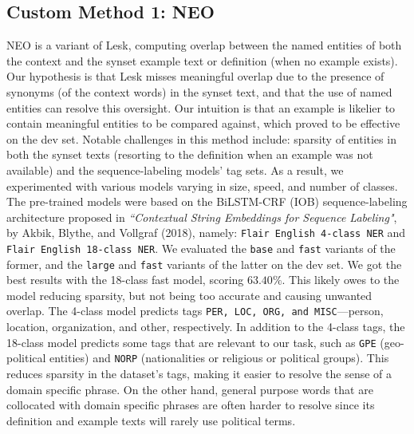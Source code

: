 \documentclass[11pt]{article}
\begin{document}
\vspace{-2ex}
\subsection{Custom Method 1: NEO}
\vspace{-1ex}
NEO is a variant of Lesk, computing overlap between the named entities of 
both the context and the synset example text or definition (when no example exists). 
Our hypothesis is that Lesk misses meaningful overlap due to the presence of 
synonyms (of the context words) in the synset text, and that the use of named entities can resolve this oversight.
Our intuition is that an example is likelier to contain meaningful entities to be compared against,
which proved to be effective on the dev set. Notable challenges in 
this method include: sparsity of entities in both the synset texts 
(resorting to the definition when an example was not available) and the sequence-labeling models' tag sets. 
As a result, we experimented with various models varying in size, speed, and number of classes. 
The pre-trained models were based on the BiLSTM-CRF (IOB) sequence-labeling architecture proposed in 
\textit{``Contextual String Embeddings for Sequence Labeling"}, 
by Akbik, Blythe, and Vollgraf (2018), namely: \texttt{Flair English 4-class NER} and \texttt{Flair English 18-class NER}.
We evaluated the \texttt{base} and \texttt{fast} variants of the former, and the \texttt{large} 
and \texttt{fast} variants of the latter on the dev set. We got the  
best results with the 18-class fast model, scoring $63.40\%$. This likely owes to the model
reducing sparsity, but not being too accurate and causing unwanted overlap. The 4-class model predicts tags \texttt{PER, LOC, ORG, and MISC}---person, location, organization, and other, respectively. 
In addition to the 4-class tags, the 18-class model predicts some tags that are relevant to our task, such as \texttt{GPE} (geo-political entities) and \texttt{NORP} (nationalities or 
religious or political groups). This reduces sparsity in the dataset's tags, making it easier to resolve the sense of a domain specific phrase. On the other hand,
general purpose words that are collocated with domain specific phrases are often harder to resolve since
its definition and example texts will rarely use political terms.
\vspace{-2ex}
\end{document}
